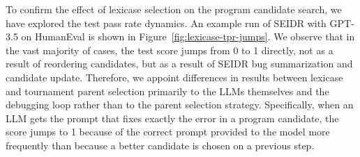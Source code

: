 To confirm the effect of lexicase selection on the program candidate search, we have explored the test pass rate dynamics.
An example run of SEIDR with GPT-3.5 on HumanEval is shown in Figure~\ref{fig:lexicase-tpr-jumps}.
We observe that in the vast majority of cases, the test score jumps from 0 to 1 directly, not as a result of reordering candidates, but as a result of SEIDR  bug summarization and candidate update.
Therefore, we appoint differences in results between lexicase and tournament parent selection primarily to the LLMs themselves and the debugging loop rather than to the parent selection strategy. 
Specifically, when an LLM gets the prompt that fixes exactly the error in a program candidate, the score jumps to 1 because of the correct prompt provided to the model more frequently than because a better candidate is chosen on a previous step.






